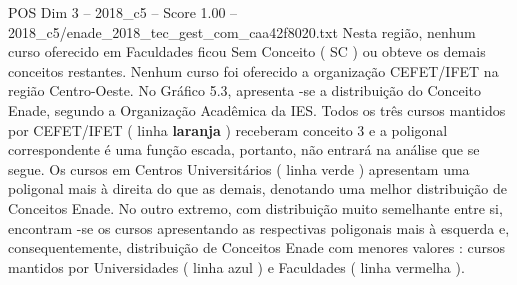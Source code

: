 \begin{textsample}{POS Dim 3 – 2018\_c5 – Score 1.00 – 2018\_c5/enade\_2018\_tec\_gest\_com\_caa42f8020.txt}
Nesta região, nenhum curso oferecido em Faculdades ficou Sem Conceito ( SC ) ou obteve os demais conceitos restantes.
Nenhum curso foi oferecido a organização CEFET/IFET na região Centro-Oeste.
No Gráfico 5.3, apresenta -se a distribuição do Conceito Enade, segundo a Organização Acadêmica da IES.
Todos os três cursos mantidos por CEFET/IFET ( linha \textbf{laranja} ) receberam conceito 3 e a poligonal correspondente é uma função escada, portanto, não entrará na análise que se segue.
Os cursos em Centros Universitários ( linha verde ) apresentam uma poligonal mais à direita do que as demais, denotando uma melhor distribuição de Conceitos Enade.
No outro extremo, com distribuição muito semelhante entre si, encontram -se os cursos apresentando as respectivas poligonais mais à esquerda e, consequentemente, distribuição de Conceitos Enade com menores valores : cursos mantidos por Universidades ( linha azul ) e Faculdades ( linha vermelha ).

\end{textsample}

